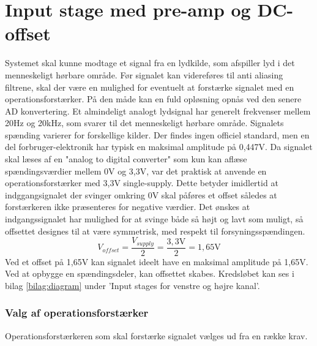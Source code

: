 \section{Input stage med pre-amp og DC-offset}
\label{sec:inputstage}
Systemet skal kunne modtage et signal fra en lydkilde, som afspiller lyd i det menneskeligt hørbare område. 
Før signalet kan videreføres til anti aliasing filtrene, skal der være en mulighed for eventuelt at forstærke signalet med en operationsforstærker. 
På den måde kan en fuld opløsning opnås ved den senere AD konvertering. 
\newline
Et almindeligt analogt lydsignal har generelt frekvenser mellem 20Hz og 20kHz, som svarer til det menneskeligt hørbare område. 
Signalets spænding varierer for forskellige kilder. 
Der findes ingen officiel standard, men en del forbruger-elektronik har typisk en maksimal amplitude på 0,447V.\cite{wikiLine} 
\newline
Da signalet skal læses af en "analog to digital converter" som kun kan aflæse spændingsværdier mellem 0V og 3,3V, var det praktisk at anvende en operationsforstærker med 3,3V single-supply.
Dette betyder imidlertid at indggangsignalet der svinger omkring 0V skal påføres et offset således at forstærkeren ikke præsenteres for negative værdier.  
Det ønskes at indgangssignalet har mulighed for at svinge både så højt og lavt som muligt, så offsettet designes til at være symmetrisk, med respekt til  forsyningsspændingen. 
\begin{equation}
	{V_{offset}} = \frac{V_{supply}}{2} = \frac{3,3\text{V}}{2} = 1,65\text{V}
\end{equation}
Ved et offset på 1,65V kan signalet ideelt have en maksimal amplitude på 1,65V. 
Ved at opbygge en spændingsdeler, kan offsettet skabes. 
Kredsløbet kan ses i bilag \ref{bilag:diagram} under 'Input stages for venstre og højre kanal'.

\subsubsection{Valg af operationsforstærker}
Operationsforstærkeren som skal forstærke signalet vælges ud fra en række krav. 

